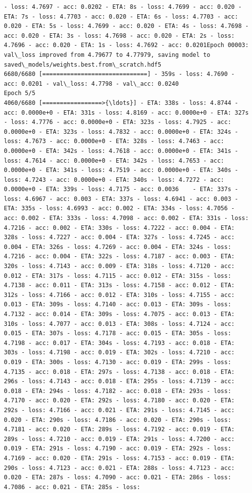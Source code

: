 \documentclass[11pt]{article}
\begin{document}
\begin{Verbatim}[commandchars=\\\{\}]
- loss: 4.7697 - acc: 0.0202 - ETA: 8s - loss: 4.7699 - acc: 0.020 - ETA: 7s - loss: 4.7703 - acc: 0.020 - ETA: 6s - loss: 4.7703 - acc: 0.020 - ETA: 5s - loss: 4.7699 - acc: 0.020 - ETA: 4s - loss: 4.7698 - acc: 0.020 - ETA: 3s - loss: 4.7698 - acc: 0.020 - ETA: 2s - loss: 4.7696 - acc: 0.020 - ETA: 1s - loss: 4.7692 - acc: 0.0201Epoch 00003: val\_loss improved from 4.79677 to 4.77979, saving model to saved\_models/weights.best.from\_scratch.hdf5
6680/6680 [==============================] - 359s - loss: 4.7690 - acc: 0.0201 - val\_loss: 4.7798 - val\_acc: 0.0240
Epoch 5/5
4060/6680 [=================>{\ldots}] - ETA: 338s - loss: 4.8744 - acc: 0.0000e+0 - ETA: 331s - loss: 4.8169 - acc: 0.0000e+0 - ETA: 327s - loss: 4.7776 - acc: 0.0000e+0 - ETA: 323s - loss: 4.7925 - acc: 0.0000e+0 - ETA: 323s - loss: 4.7832 - acc: 0.0000e+0 - ETA: 324s - loss: 4.7673 - acc: 0.0000e+0 - ETA: 328s - loss: 4.7463 - acc: 0.0000e+0 - ETA: 342s - loss: 4.7618 - acc: 0.0000e+0 - ETA: 341s - loss: 4.7614 - acc: 0.0000e+0 - ETA: 342s - loss: 4.7653 - acc: 0.0000e+0 - ETA: 341s - loss: 4.7519 - acc: 0.0000e+0 - ETA: 340s - loss: 4.7243 - acc: 0.0000e+0 - ETA: 340s - loss: 4.7272 - acc: 0.0000e+0 - ETA: 339s - loss: 4.7175 - acc: 0.0036    - ETA: 337s - loss: 4.6967 - acc: 0.003 - ETA: 337s - loss: 4.6941 - acc: 0.003 - ETA: 335s - loss: 4.6993 - acc: 0.002 - ETA: 334s - loss: 4.7056 - acc: 0.002 - ETA: 333s - loss: 4.7098 - acc: 0.002 - ETA: 331s - loss: 4.7216 - acc: 0.002 - ETA: 330s - loss: 4.7222 - acc: 0.004 - ETA: 328s - loss: 4.7227 - acc: 0.004 - ETA: 327s - loss: 4.7245 - acc: 0.004 - ETA: 326s - loss: 4.7269 - acc: 0.004 - ETA: 324s - loss: 4.7216 - acc: 0.004 - ETA: 322s - loss: 4.7187 - acc: 0.003 - ETA: 320s - loss: 4.7143 - acc: 0.009 - ETA: 318s - loss: 4.7120 - acc: 0.012 - ETA: 317s - loss: 4.7115 - acc: 0.012 - ETA: 315s - loss: 4.7138 - acc: 0.011 - ETA: 313s - loss: 4.7158 - acc: 0.012 - ETA: 312s - loss: 4.7166 - acc: 0.012 - ETA: 310s - loss: 4.7155 - acc: 0.013 - ETA: 309s - loss: 4.7140 - acc: 0.013 - ETA: 309s - loss: 4.7132 - acc: 0.014 - ETA: 309s - loss: 4.7075 - acc: 0.013 - ETA: 310s - loss: 4.7077 - acc: 0.013 - ETA: 308s - loss: 4.7124 - acc: 0.015 - ETA: 307s - loss: 4.7178 - acc: 0.015 - ETA: 305s - loss: 4.7198 - acc: 0.017 - ETA: 304s - loss: 4.7193 - acc: 0.018 - ETA: 303s - loss: 4.7198 - acc: 0.019 - ETA: 302s - loss: 4.7210 - acc: 0.019 - ETA: 300s - loss: 4.7130 - acc: 0.019 - ETA: 299s - loss: 4.7135 - acc: 0.018 - ETA: 297s - loss: 4.7138 - acc: 0.018 - ETA: 296s - loss: 4.7143 - acc: 0.018 - ETA: 295s - loss: 4.7139 - acc: 0.018 - ETA: 294s - loss: 4.7182 - acc: 0.018 - ETA: 293s - loss: 4.7170 - acc: 0.020 - ETA: 292s - loss: 4.7180 - acc: 0.020 - ETA: 292s - loss: 4.7166 - acc: 0.021 - ETA: 291s - loss: 4.7145 - acc: 0.020 - ETA: 290s - loss: 4.7186 - acc: 0.020 - ETA: 290s - loss: 4.7181 - acc: 0.020 - ETA: 289s - loss: 4.7192 - acc: 0.019 - ETA: 289s - loss: 4.7210 - acc: 0.019 - ETA: 291s - loss: 4.7200 - acc: 0.019 - ETA: 291s - loss: 4.7190 - acc: 0.019 - ETA: 292s - loss: 4.7169 - acc: 0.020 - ETA: 291s - loss: 4.7153 - acc: 0.019 - ETA: 290s - loss: 4.7123 - acc: 0.021 - ETA: 288s - loss: 4.7123 - acc: 0.020 - ETA: 287s - loss: 4.7090 - acc: 0.021 - ETA: 286s - loss: 4.7086 - acc: 0.021 - ETA: 285s - loss: 
\end{Verbatim}
\end{document}

